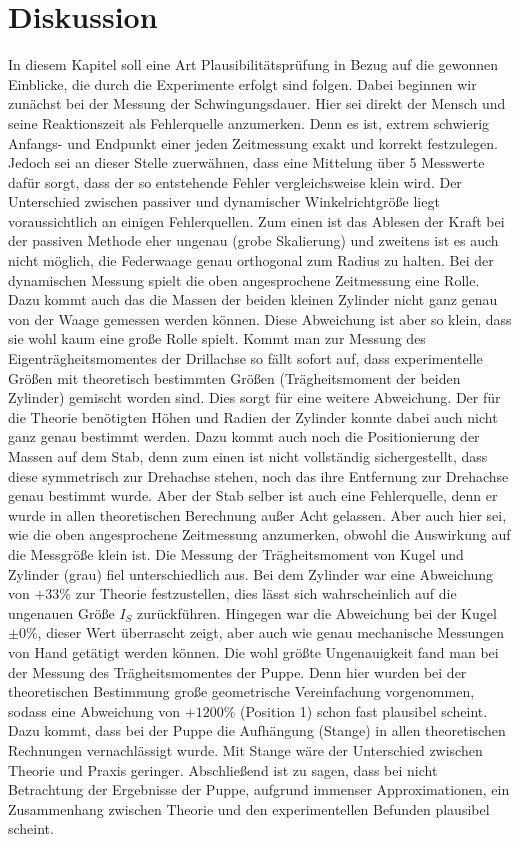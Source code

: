 \section{Diskussion}
In diesem Kapitel soll eine Art Plausibilitätsprüfung in Bezug auf die
gewonnen Einblicke, die durch die Experimente erfolgt sind folgen.
Dabei beginnen wir zunächst bei der Messung der Schwingungsdauer.
Hier sei direkt der Mensch und seine Reaktionszeit als Fehlerquelle anzumerken. 
Denn es ist, extrem schwierig Anfangs- und Endpunkt einer jeden Zeitmessung exakt 
und korrekt festzulegen. Jedoch sei an dieser Stelle zuerwähnen, dass eine Mittelung 
über 5 Messwerte dafür sorgt, dass der so entstehende Fehler vergleichsweise klein wird.
Der Unterschied zwischen passiver und dynamischer Winkelrichtgröße liegt voraussichtlich 
an einigen Fehlerquellen. Zum einen ist das Ablesen der Kraft bei der passiven Methode 
eher ungenau (grobe Skalierung) und zweitens ist es auch nicht möglich, 
die Federwaage genau orthogonal zum Radius zu halten.
Bei der dynamischen Messung spielt die oben angesprochene Zeitmessung eine Rolle.
Dazu kommt auch das die Massen der beiden kleinen Zylinder nicht ganz genau von der 
Waage gemessen werden können.
Diese Abweichung ist aber so klein, dass sie wohl kaum eine große Rolle spielt.
Kommt man zur Messung des Eigenträgheitsmomentes der Drillachse so fällt sofort auf, 
dass experimentelle Größen mit theoretisch bestimmten Größen (Trägheitsmoment der beiden Zylinder) 
gemischt worden sind. Dies sorgt für eine weitere Abweichung. Der für die Theorie benötigten 
Höhen und Radien der Zylinder konnte dabei auch nicht ganz genau bestimmt werden.
Dazu kommt auch noch die Positionierung der Massen auf dem Stab, denn zum einen ist nicht 
vollständig sichergestellt, dass diese symmetrisch zur Drehachse stehen, noch das ihre 
Entfernung zur Drehachse genau bestimmt wurde. Aber der Stab selber ist auch eine 
Fehlerquelle, denn er wurde in allen theoretischen Berechnung außer Acht gelassen.
Aber auch hier sei, wie die oben angesprochene Zeitmessung anzumerken, obwohl die 
Auswirkung auf die Messgröße klein ist.
Die Messung der Trägheitsmoment von Kugel und Zylinder (grau) fiel unterschiedlich aus.
Bei dem Zylinder war eine Abweichung von $+33\%$ zur Theorie festzustellen, 
dies lässt sich wahrscheinlich auf die ungenauen Größe $I_S$ zurückführen.
Hingegen war die Abweichung bei der Kugel $\pm 0\%$, dieser Wert überrascht zeigt,
aber auch wie genau mechanische Messungen von Hand getätigt werden können.
Die wohl größte Ungenauigkeit fand man bei der Messung des Trägheitsmomentes der Puppe. 
Denn hier wurden bei der theoretischen Bestimmung große geometrische Vereinfachung 
vorgenommen, sodass eine Abweichung von $+1200\%$ (Position 1) schon fast plausibel scheint. %
Dazu kommt, dass bei der Puppe die Aufhängung (Stange) in allen theoretischen 
Rechnungen vernachlässigt wurde. Mit Stange wäre der Unterschied zwischen Theorie und Praxis geringer.
Abschließend ist zu sagen, dass bei nicht Betrachtung der Ergebnisse der Puppe, 
aufgrund immenser Approximationen, ein Zusammenhang zwischen Theorie und den
experimentellen Befunden plausibel scheint.